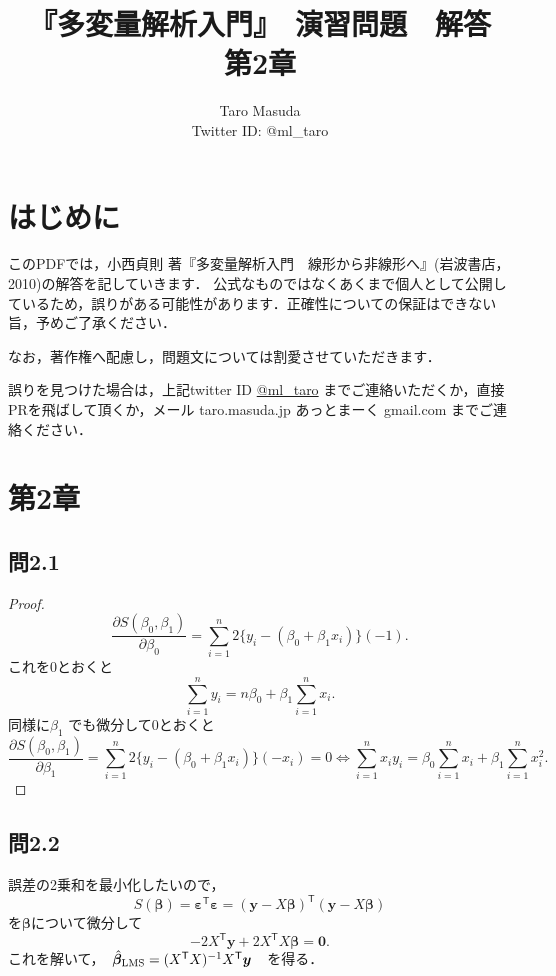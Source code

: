 \documentclass[pdflatex,ja=standard]{bxjsarticle}
\title{『多変量解析入門』　演習問題　解答　第2章}
\author{Taro Masuda \\ Twitter ID: @ml\_taro}
\begin{document}
\maketitle

\section*{はじめに}
このPDFでは，小西貞則 著『多変量解析入門　線形から非線形へ』(岩波書店，2010)の解答を記していきます．
公式なものではなくあくまで個人として公開しているため，誤りがある可能性があります．正確性についての保証はできない旨，予めご了承ください．

なお，著作権へ配慮し，問題文については割愛させていただきます．

誤りを見つけた場合は，上記twitter ID \href{https://twitter.com/ml_taro}{@ml\_taro} までご連絡いただくか，直接PRを飛ばして頂くか，メール taro.masuda.jp あっとまーく gmail.com までご連絡ください．

\section*{第2章}

\subsection*{問2.1}

\begin{proof}
\begin{equation}
\frac{\partial S(\beta_{0}, \beta_{1})}{\partial \beta_{0}} =  \sum_{i=1}^{n} 2 \{ y_i - ( \beta_0 + \beta_1 x_i )  \}  (-1) .
\end{equation}
これを0とおくと
\begin{equation}
\sum_{i=1}^{n} y_i = n \beta_0 + \beta_1 \sum_{i=1}^{n} x_i. 
\end{equation}
同様に$\beta_1$ でも微分して0とおくと
\begin{equation}
\frac{\partial S(\beta_{0}, \beta_{1})}{\partial \beta_{1}} =  \sum_{i=1}^{n} 2 \{ y_i - ( \beta_0 + \beta_1 x_i )  \} (-x_i) = 0
\iff \sum_{i=1}^{n} x_i y_i =  \beta_0 \sum_{i=1}^{n} x_i + \beta_1 \sum_{i=1}^{n} x_i^2.
\end{equation}
\end{proof}

\subsection*{問2.2}
誤差の2乗和を最小化したいので，
\begin{equation}
S(\bm{\beta}) = \bm{\varepsilon}^{\mathsf{T}} \bm{\varepsilon} = (\bm{y} - X \bm{\beta})^{\mathsf{T}} (\bm{y} - X \bm{\beta})
\end{equation}
を$\bm{\beta}$について微分して
\begin{equation}
- 2 X^{\mathsf{T}} \bm{y} + 2 X^{\mathsf{T}}X \bm{\beta} = \bm{0}. 
\end{equation}
これを解いて，　$\hat{\bm{\beta}}_{\rm{LMS}} = (X^{\mathsf{T}} X)^{-1} X^{\mathsf{T}} \bm{y}$　を得る．
\end{document}
